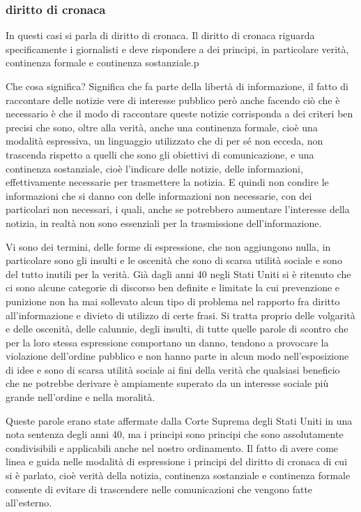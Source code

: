 \subsubsection{diritto di cronaca}
In questi casi si parla di diritto di cronaca. Il diritto di cronaca riguarda specificamente i giornalisti e deve rispondere a dei principi, in particolare verità, continenza formale e continenza sostanziale.p\par
Che cosa significa? Significa che fa parte della libertà di informazione, il fatto di raccontare delle notizie vere di interesse pubblico però anche facendo ciò che è necessario è che il modo di raccontare queste notizie corrisponda a dei criteri ben precisi che sono, oltre alla verità, anche una continenza formale, cioè una modalità espressiva, un linguaggio utilizzato che di per sé non ecceda, non trascenda rispetto a quelli che sono gli obiettivi di comunicazione, e una continenza sostanziale, cioè l'indicare delle notizie, delle informazioni, effettivamente necessarie per trasmettere la notizia. E quindi non condire le informazioni che si danno con delle informazioni non necessarie, con dei particolari non necessari, i quali, anche se potrebbero aumentare l'interesse della notizia, in realtà non sono essenziali per la trasmissione dell'informazione.\par
Vi sono dei termini, delle forme di espressione, che non aggiungono nulla, in particolare sono gli insulti e le oscenità che sono di scarsa utilità sociale e sono del tutto inutili per la verità. Già dagli anni 40 negli Stati Uniti si è ritenuto che ci sono alcune categorie di discorso ben definite e limitate la cui prevenzione e punizione non ha mai sollevato alcun tipo di problema nel rapporto fra diritto all'informazione e divieto di utilizzo di certe frasi. Si tratta proprio delle volgarità e delle oscenità, delle calunnie, degli insulti, di tutte quelle parole di scontro che per la loro stessa espressione comportano un danno, tendono a provocare la violazione dell'ordine pubblico e non hanno parte in alcun modo nell'esposizione di idee e sono di scarsa utilità sociale ai fini della verità che qualsiasi beneficio che ne potrebbe derivare è ampiamente superato da un interesse sociale più grande nell'ordine e nella moralità.\par
Queste parole erano state affermate dalla Corte Suprema degli Stati Uniti in una nota sentenza degli anni 40, ma i principi sono principi che sono assolutamente condivisibili e applicabili anche nel nostro ordinamento. Il fatto di avere come linea e guida nelle modalità di espressione i principi del diritto di cronaca di cui si è parlato, cioè verità della notizia, continenza sostanziale e continenza formale consente di evitare di trascendere nelle comunicazioni che vengono fatte all'esterno.\par
